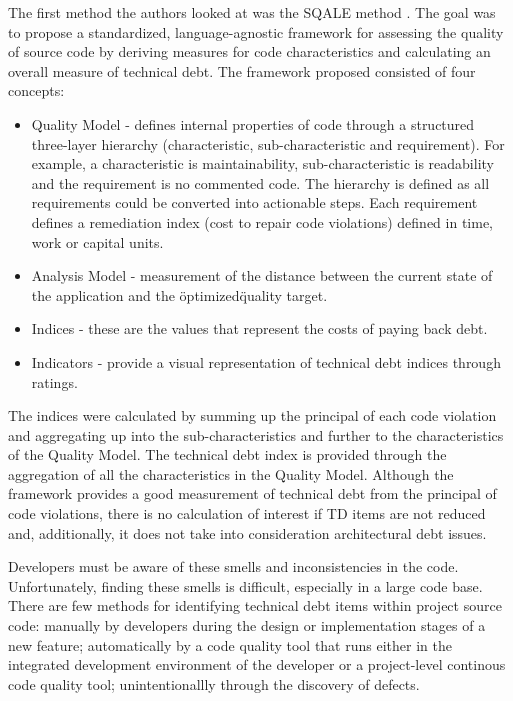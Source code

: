 \documentclass{mprop}
\begin{document}
The first method the authors looked at was the SQALE method \cite{Letouzey2012}.
The goal was to propose a standardized, language-agnostic framework for
assessing the quality of source code by deriving measures for code
characteristics and calculating an overall measure of technical debt. The
framework proposed consisted of four concepts:
\begin{itemize}
	\item Quality Model - defines internal properties of code through a
	structured three-layer hierarchy (characteristic, sub-characteristic and
	requirement). For example, a characteristic is maintainability,
	sub-characteristic is readability and the requirement is no commented
	code. The hierarchy is defined as all requirements could be converted into
	actionable steps. Each requirement defines a remediation index (cost to
	repair code violations) defined in time, work or capital units.
	\item Analysis Model - measurement of the distance between the current
	state of the application and the \"optimized\" quality target.
	\item Indices - these are the values that represent the costs of paying
	back debt. 
	\item Indicators - provide a visual representation of technical debt indices
	through ratings.
\end{itemize}
The indices were calculated by summing up the principal of each code violation
and aggregating up into the sub-characteristics and further to the
characteristics of the Quality Model. The technical debt index is provided
through the aggregation of all the characteristics in the Quality Model.
Although the framework provides a good measurement of technical debt from the
principal of code violations, there is no calculation of interest if TD items
are not reduced and, additionally, it does not take into consideration
architectural debt issues.



Developers must be aware of these smells and inconsistencies in the code.
Unfortunately, finding these smells is difficult, especially in a large code
base. There are few methods for identifying technical debt items within project
source code: manually by developers during the design or implementation stages
of a new feature; automatically by a code quality tool that runs either in the
integrated development environment of the developer or a project-level continous
code quality tool; unintentionallly through the discovery of defects.
\end{document}
